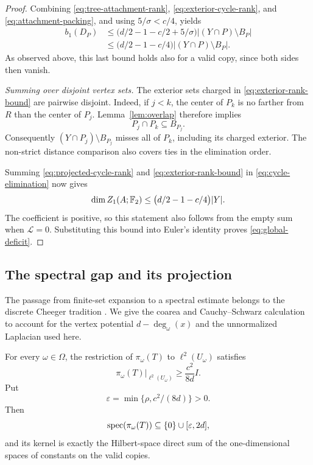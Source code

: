 \begin{proof}
Combining \eqref{eq:tree-attachment-rank},
\eqref{eq:exterior-cycle-rank}, and \eqref{eq:attachment-packing}, and
using $5/\sigma<c/4$, yields
\begin{equation}
 \begin{split}
 b_1(D_P)
 &\le\bigl(d/2-1-c/2+5/\sigma\bigr)
       |(Y\cap P)\setminus B_P|\\
 &\le\bigl(d/2-1-c/4\bigr)|(Y\cap P)\setminus B_P|.
 \end{split}
 \label{eq:exterior-rank-bound}
\end{equation}
As observed above, this last bound holds also for a valid copy, since
both sides then vanish.

\emph{Summing over disjoint vertex sets.}
The exterior sets charged in \eqref{eq:exterior-rank-bound} are
pairwise disjoint.  Indeed, if $j<k$, the center of $P_k$ is no farther
from $R$ than the center of $P_j$.  Lemma~\ref{lem:overlap} therefore
implies
\[
 P_j\cap P_k\subseteq B_{P_j}.
\]
Consequently $(Y\cap P_j)\setminus B_{P_j}$ misses all of $P_k$,
including its charged exterior.  The non-strict distance comparison
also covers ties in the elimination order.

Summing \eqref{eq:projected-cycle-rank} and
\eqref{eq:exterior-rank-bound} in \eqref{eq:cycle-elimination} now gives
\[
 \dim Z_1(A;\mathbb F_2)\le\bigl(d/2-1-c/4\bigr)|Y|.
\]
The coefficient is positive, so this statement also follows from the
empty sum when $\mathcal L=0$.  Substituting this bound into Euler's
identity proves \eqref{eq:global-deficit}.
\end{proof}

\subsection{The spectral gap and its projection}

The passage from finite-set expansion to a spectral estimate belongs to
the discrete Cheeger tradition \cite{Dodziuk1984,AlonMilman1985}. We give
the coarea and Cauchy--Schwarz calculation to account for the vertex
potential $d-\deg_\omega(x)$ and the unnormalized Laplacian used here.

\begin{lemma}
\label{lem:spectral-gap}
For every $\omega\in\Omega$, the restriction of $\pi_\omega(T)$ to
$\ell^2(U_\omega)$ satisfies
\begin{equation}
 \pi_\omega(T)|_{\ell^2(U_\omega)}\ge\frac{c^2}{8d}I.
 \label{eq:remaining-spectral-bound}
\end{equation}
Put
\[
 \varepsilon=\min\{\rho,c^2/(8d)\}>0.
\]
Then
\begin{equation}
 \operatorname{spec}(\pi_\omega(T))\subseteq\{0\}\cup[\varepsilon,2d],
 \label{eq:uniform-spectrum}
\end{equation}
and its kernel is exactly the Hilbert-space direct sum of the
one-dimensional spaces of constants on the valid copies.
\end{lemma}

